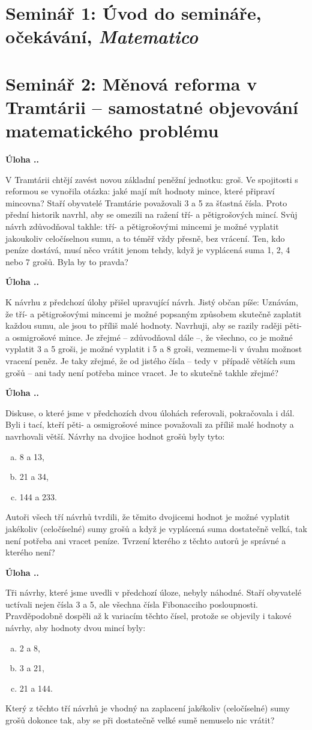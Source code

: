 \documentclass{article}
\newcounter{seminar}
\newcounter{problem}
\newcommand{\seminar}[2]{
  \clearpage
  \setcounter{seminar}{#1}
  \setcounter{problem}{0}
  \section*{Seminář #1: #2}
}
\newcommand{\source}[1]{
  \def\temp{#1}\ifx\temp\empty
  \else
    [#1]
  \fi
}
\newcommand{\problem}[4]{
  \stepcounter{problem}
  \noindent\textbf{Úloha \theseminar .\theproblem.}
    \source{#1} #3
  \bigskip
}
\begin{document}
\seminar{1}{Úvod do semináře, očekávání, \textit{Matematico}}

\seminar{2}{Měnová reforma v Tramtárii -- samostatné objevování matematického problému}

\problem{}{}{
V Tramtárii chtějí zavést novou základní peněžní jednotku: groš. Ve spojitosti s reformou se vynořila otázka: jaké mají mít hodnoty mince, které připraví mincovna? Staří obyvatelé Tramtárie považovali 3 a 5 za šťastná čísla. Proto přední historik navrhl, aby se omezili na ražení tří- a pětigrošových mincí. Svůj návrh zdůvodňoval takhle: tří- a pětigrošovými mincemi je možné vyplatit jakoukoliv celočíselnou sumu, a to téměř vždy přesně, bez vrácení. Ten, kdo peníze dostává, musí něco vrátit jenom tehdy, když je vyplácená suma 1, 2, 4 nebo 7 grošů. Byla by to pravda?
}{
}

\problem{}{}{
K návrhu z předchozí úlohy přišel upravující návrh. Jistý občan píše: Uznávám, že tří- a pětigrošovými mincemi je možné popsaným způsobem skutečně zaplatit každou sumu, ale jsou to příliš malé hodnoty. Navrhuji, aby se razily raději pěti- a osmigrošové mince. Je zřejmé -- zdůvodňoval dále --, že všechno, co je možné vyplatit 3 a 5 groši, je možné vyplatit i 5 a 8 groši, vezmeme-li v úvahu možnost vracení peněz. Je taky zřejmé, že od jistého čísla -- tedy v~případě větších sum grošů -- ani tady není potřeba mince vracet. Je to skutečně takhle zřejmé?
}{
}

\problem{}{}{
Diskuse, o které jsme v předchozích dvou úlohách referovali, pokračovala i dál. Byli i tací, kteří pěti- a osmigrošové mince považovali za příliš malé hodnoty a navrhovali větší. Návrhy na dvojice hodnot grošů byly tyto:
\begin{enumerate}[a)]
\item 8 a 13,
\item 21 a 34,
\item 144 a 233.
\end{enumerate}
Autoři všech tří návrhů tvrdili, že těmito dvojicemi hodnot je možné vyplatit jakékoliv (celočíselné) sumy grošů a když je vyplácená suma dostatečně velká, tak není potřeba ani vracet peníze. Tvrzení kterého z těchto autorů je správné a kterého není?
}{
}

\problem{}{}{
Tři návrhy, které jsme uvedli v předchozí úloze, nebyly náhodné. Staří obyvatelé uctívali nejen čísla 3 a 5, ale všechna čísla Fibonacciho posloupnosti. Pravděpodobně dospěli až k variacím těchto čísel, protože se objevily i takové návrhy, aby hodnoty dvou mincí byly:
\begin{enumerate}[a)]
\item 2 a 8,
\item 3 a 21,
\item 21 a 144.
\end{enumerate}
Který z těchto tří návrhů je vhodný na zaplacení jakékoliv (celočíselné) sumy grošů dokonce tak, aby se při dostatečně velké sumě nemuselo nic vrátit?
}{
}
\end{document}
